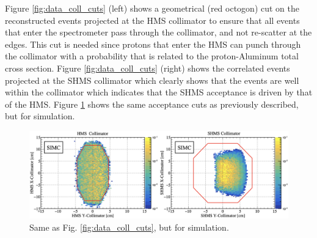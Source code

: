\documentclass[aps, prl]{revtex4-2}  %
\begin{document}
\clearpage
\indent Figure \ref{fig:data_coll_cuts} (left) shows a geometrical (red octogon) cut on the reconstructed events projected at the HMS collimator to ensure
that all events that enter the spectrometer pass through the collimator, and not re-scatter at the edges. This cut is needed since protons that enter the
HMS can punch through the collimator with a probability that is related to the proton-Aluminum total cross section. Figure \ref{fig:data_coll_cuts} (right)
shows the correlated events projected at the SHMS collimator which clearly shows that the events are well within the collimator which indicates that the SHMS
acceptance is driven by that of the HMS. Figure \ref{fig:simc_coll_cuts} shows the same acceptance cuts as previously described, but for simulation.\\
\begin{figure}[!h]
\includegraphics[scale=0.24]{plots/collimator_CUT_80MeV_35deg_SIMC.png}
\caption{Same as Fig. \ref{fig:data_coll_cuts}, but for simulation.}
\label{fig:simc_coll_cuts}
\end{figure}
\end{document}
